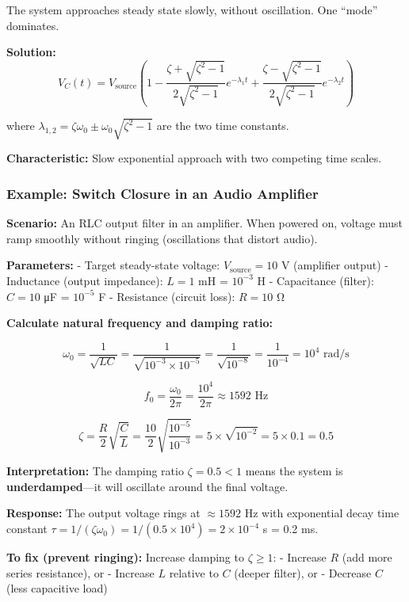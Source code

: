\documentclass[
]{article}
\begin{document}
The system approaches steady state slowly, without oscillation. One
``mode'' dominates.

\textbf{Solution:}
\[V_C(t) = V_{\text{source}}\left(1 - \frac{\zeta + \sqrt{\zeta^2 - 1}}{2\sqrt{\zeta^2 - 1}}e^{-\lambda_1 t} + \frac{\zeta - \sqrt{\zeta^2 - 1}}{2\sqrt{\zeta^2 - 1}}e^{-\lambda_2 t}\right)\]

where \(\lambda_{1,2} = \zeta\omega_0 \pm \omega_0\sqrt{\zeta^2 - 1}\)
are the two time constants.

\textbf{Characteristic:} Slow exponential approach with two competing
time scales.

\subsubsection{Example: Switch Closure in an Audio
Amplifier}\label{example-switch-closure-in-an-audio-amplifier}

\textbf{Scenario:} An RLC output filter in an amplifier. When powered
on, voltage must ramp smoothly without ringing (oscillations that
distort audio).

\textbf{Parameters:} - Target steady-state voltage:
\(V_{\text{source}} = 10\) V (amplifier output) - Inductance (output
impedance): \(L = 1\) mH = \(10^{-3}\) H - Capacitance (filter):
\(C = 10\) μF = \(10^{-5}\) F - Resistance (circuit loss): \(R = 10\) Ω

\textbf{Calculate natural frequency and damping ratio:}

\[\omega_0 = \frac{1}{\sqrt{LC}} = \frac{1}{\sqrt{10^{-3} \times 10^{-5}}} = \frac{1}{\sqrt{10^{-8}}} = \frac{1}{10^{-4}} = 10^4 \text{ rad/s}\]

\[f_0 = \frac{\omega_0}{2\pi} = \frac{10^4}{2\pi} \approx 1592 \text{ Hz}\]

\[\zeta = \frac{R}{2}\sqrt{\frac{C}{L}} = \frac{10}{2}\sqrt{\frac{10^{-5}}{10^{-3}}} = 5 \times \sqrt{10^{-2}} = 5 \times 0.1 = 0.5\]

\textbf{Interpretation:} The damping ratio \(\zeta = 0.5 < 1\) means the
system is \textbf{underdamped}---it will oscillate around the final
voltage.

\textbf{Response:} The output voltage rings at \(\approx 1592\) Hz with
exponential decay time constant
\(\tau = 1/(\zeta\omega_0) = 1/(0.5 \times 10^4) = 2 \times 10^{-4}\) s
= 0.2 ms.

\textbf{To fix (prevent ringing):} Increase damping to \(\zeta \geq 1\):
- Increase \(R\) (add more series resistance), or - Increase \(L\)
relative to \(C\) (deeper filter), or - Decrease \(C\) (less capacitive
load)
\end{document}

